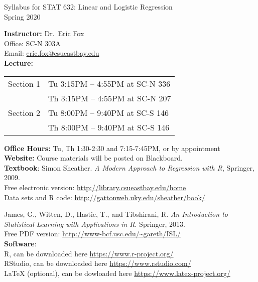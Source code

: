 \documentclass[11pt]{report}
\begin{document}
\setlength\parindent{0pt}

\begin{center}
\Large
Syllabus for STAT 632: Linear and Logistic Regression\\
\large
Spring 2020\\   
\end{center}
\vspace{5pt}

\normalsize
\textbf{Instructor:} Dr.~Eric Fox\\ 
Office: SC-N 303A\\ 
Email: \url{eric.fox@csueastbay.edu}\\

\textbf{Lecture:}
\begin{table}[ht!]
\begin{tabular}{|l|l|}
\hline
Section 1 & Tu 3:15PM --  4:55PM at SC-N 336\\
 & Th 3:15PM --  4:55PM at SC-N 207\\
 \hline
Section 2 & Tu 8:00PM --  9:40PM at SC-S 146\\
& Th 8:00PM --  9:40PM at SC-S 146\\
\hline
\end{tabular}
\end{table}

\textbf{Office Hours:} Tu, Th 1:30-2:30 and 7:15-7:45PM, or by appointment\\

\textbf{Website:} Course materials will be posted on Blackboard.\\ 

\textbf{Textbook}: Simon Sheather. \emph{A Modern Approach to Regression with R}, Springer, 2009.\\
Free electronic version: \url{http://library.csueastbay.edu/home}\\
Data sets and R code: \url{http://gattonweb.uky.edu/sheather/book/}
\vspace{6pt}

James, G., Witten, D., Hastie, T., and Tibshirani, R. \emph{An Introduction to Statistical Learning with Applications in R}. Springer, 2013.\\
Free PDF version: \url{http://www-bcf.usc.edu/~gareth/ISL/}\\ 

\textbf{Software}:\\ 
R, can be downloaded here \url{https://www.r-project.org/}\\
RStudio, can be downloaded here \url{https://www.rstudio.com/}\\
LaTeX (optional), can be dowloaded here \url{https://www.latex-project.org/}\\
\end{document}
